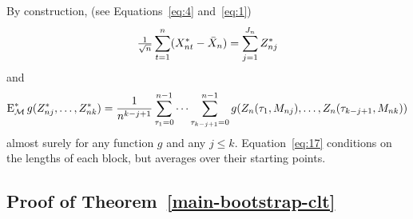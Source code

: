 \documentclass[11pt]{article}
\begin{document}
By construction, (see Equations~\eqref{eq:4} and~\eqref{eq:1})
\begin{equation}\label{eq:16}
  \tfrac{1}{\sqrt{n}} \sum_{t=1}^n (X_{nt}^{*} - \bar X_n)
  = \sum_{j=1}^{J_n} \Zb
\end{equation}
and
\begin{equation}\label{eq:17}
  \Em^{*}g(\Zb,\dots,\Zb[k]) = \frac{1}{n^{k-j+1}}
  \sum_{\tau_1=0}^{n-1} \cdots \sum_{\tau_{k-j+1}=0}^{n-1}
  g(Z_n(\tau_1, M_{nj}),\dots,Z_n(\tau_{k-j+1}, M_{nk}))
\end{equation}
almost surely for any function $g$ and any $j \leq k$. Equation~\eqref{eq:17}
conditions on the lengths of each block, but averages over their
starting points.

\subsection*{Proof of Theorem~\ref{main-bootstrap-clt}}
\end{document}
